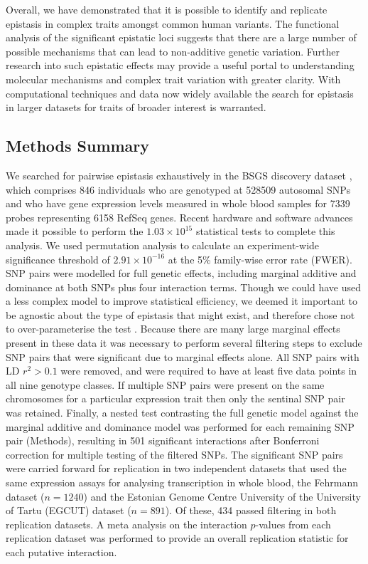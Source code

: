\documentclass{article}
\begin{document}
Overall, we have demonstrated that it is possible to identify and replicate epistasis in complex traits amongst common human variants. The functional analysis of the significant epistatic loci suggests that there are a large number of possible mechanisms that can lead to non-additive genetic variation. Further research into such epistatic effects may provide a useful portal to understanding molecular mechanisms and complex trait variation with greater clarity. With computational techniques and data now widely available the search for epistasis in larger datasets for traits of broader interest is warranted.


\subsection{Methods Summary}
We searched for pairwise epistasis exhaustively in the BSGS discovery dataset \cite{Powell2012}, which comprises 846 individuals who are genotyped at 528509 autosomal SNPs and who have gene expression levels measured in whole blood samples for 7339 probes representing 6158 RefSeq genes. Recent hardware and software \cite{Hemani2011} advances made it possible to perform the $1.03 \times 10^{15}$ statistical tests to complete this analysis. We used permutation analysis \cite{Churchill1994a} to calculate an experiment-wide significance threshold of $2.91 \times 10^{-16}$ at the 5\% family-wise error rate (FWER). SNP pairs were modelled for full genetic effects, including marginal additive and dominance at both SNPs plus four interaction terms. Though we could have used a less complex model to improve statistical efficiency, we deemed it important to be agnostic about the type of epistasis that might exist, and therefore chose not to over-parameterise the test \cite{Marchini2005, Hemani2013}. Because there are many large marginal effects present in these data it was necessary to perform several filtering steps to exclude SNP pairs that were significant due to marginal effects alone. All SNP pairs with LD $r^2 > 0.1$ were removed, and were required to have at least five data points in all nine genotype classes. If multiple SNP pairs were present on the same chromosomes for a particular expression trait then only the sentinal SNP pair was retained. Finally, a nested test contrasting the full genetic model against the marginal additive and dominance model was performed for each remaining SNP pair (Methods), resulting in 501 significant interactions after Bonferroni correction for multiple testing of the filtered SNPs. The significant SNP pairs were carried forward for replication in two independent datasets that used the same expression assays for analysing transcription in whole blood, the Fehrmann dataset \cite{Fehrmann2011} ($n=1240$) and the Estonian Genome Centre University of the University of Tartu (EGCUT) dataset \cite{Metspalu2004} ($n=891$). Of these, 434 passed filtering in both replication datasets. A meta analysis on the interaction $p$-values from each replication dataset was performed to provide an overall replication statistic for each putative interaction.
\end{document}
